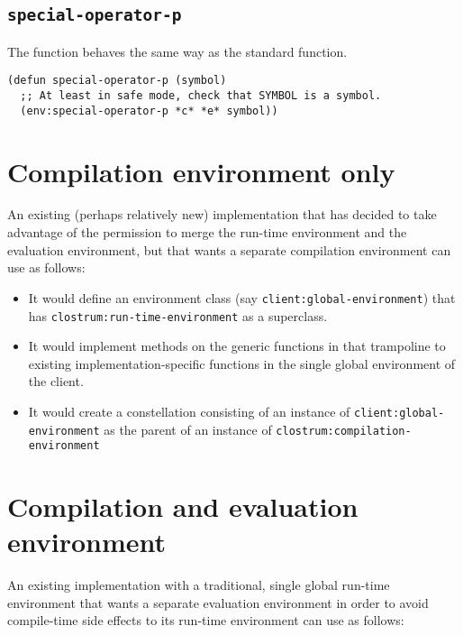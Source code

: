 \subsection{\texttt{special-operator-p}}

The \sysname{} function behaves the same way as the standard function.

\begin{verbatim}
(defun special-operator-p (symbol)
  ;; At least in safe mode, check that SYMBOL is a symbol.
  (env:special-operator-p *c* *e* symbol))
\end{verbatim}

\section{Compilation environment only}

An existing (perhaps relatively new) \commonlisp{} implementation that
has decided to take advantage of the permission to merge the run-time
environment and the evaluation environment, but that wants a separate
compilation environment can use \sysname{} as follows:

\begin{itemize}
\item It would define an environment class  (say
  \texttt{client:global-environment}) that has
  \texttt{clostrum:run-time-environment} as a superclass.
\item It would implement methods on the generic functions in
   that trampoline to existing
  implementation-specific functions in the single global environment
  of the client.
\item It would create a constellation consisting of an instance of
  \texttt{client:global-environment} as the parent of an instance of
  \texttt{clostrum:compilation-environment}
\end{itemize}

\section{Compilation and evaluation environment}

An existing \commonlisp{} implementation with a traditional, single
global run-time environment that wants a separate evaluation
environment in order to avoid compile-time side effects to its
run-time environment can use \sysname{} as follows:

